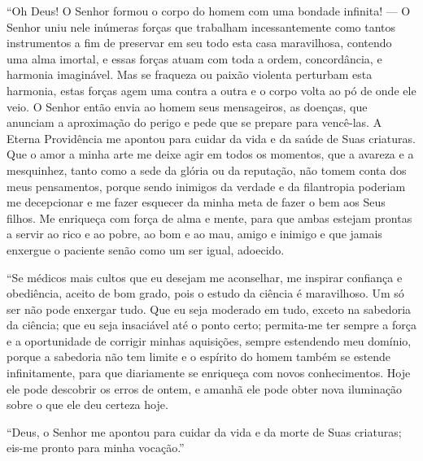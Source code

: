 ``Oh Deus! O Senhor formou o corpo do homem com uma bondade infinita!
--- O Senhor uniu nele inúmeras forças que trabalham incessantemente
como tantos instrumentos a fim de preservar em seu todo esta casa
maravilhosa, contendo uma alma imortal, e essas forças atuam com toda a
ordem, concordância, e harmonia imaginável. Mas se fraqueza ou paixão
violenta perturbam esta harmonia, estas forças agem uma contra a outra
e o corpo volta ao pó de onde ele veio. O Senhor então envia ao homem
seus mensageiros, as doenças, que anunciam a aproximação do perigo e
pede que se prepare para vencê-las. A Eterna Providência me apontou para
cuidar da vida e da saúde de Suas criaturas. Que o amor a minha arte me
deixe agir em todos os momentos, que a avareza e a mesquinhez, tanto
como a sede da glória ou da reputação, não tomem conta dos meus
pensamentos, porque sendo inimigos da verdade e da filantropia poderiam
me decepcionar e me fazer esquecer da minha meta de fazer o bem aos Seus
filhos. Me enriqueça com força de alma e mente, para que ambas estejam
prontas a servir ao rico e ao pobre, ao bom e ao mau, amigo e inimigo e
que jamais enxergue o paciente senão como um ser igual, adoecido.

``Se médicos mais cultos que eu desejam me aconselhar, me inspirar
confiança e obediência, aceito de bom grado, pois o estudo da ciência é
maravilhoso. Um só ser não pode enxergar tudo. Que eu seja moderado em
tudo, exceto na sabedoria da ciência; que eu seja insaciável até o ponto
certo; permita-me ter sempre a força e a oportunidade de corrigir
minhas aquisições, sempre estendendo meu domínio, porque a sabedoria
não tem limite e o espírito do homem também se estende infinitamente,
para que diariamente se enriqueça com novos conhecimentos. Hoje ele
pode descobrir os erros de ontem, e amanhã ele pode obter nova
iluminação sobre o que ele deu certeza hoje.

``Deus, o Senhor me apontou para cuidar da vida e da morte de Suas
criaturas; eis-me pronto para minha vocação.''

